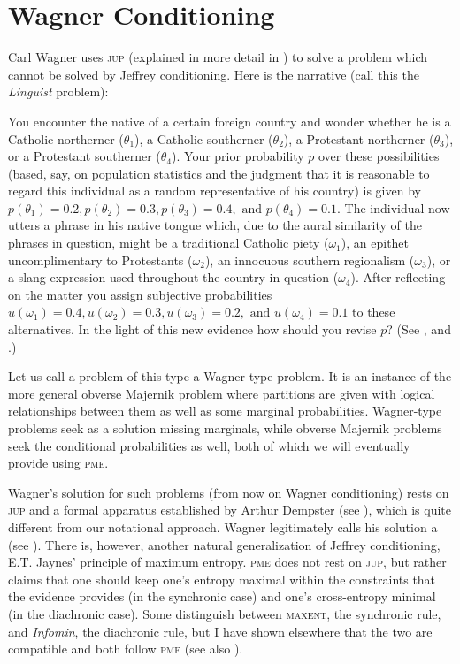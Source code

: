 \documentclass[11pt]{article}
\begin{document}
\section{Wagner Conditioning}
\label{wc}

Carl Wagner uses \textsc{jup} (explained in more detail in
) to solve a problem which cannot be solved by
Jeffrey conditioning. Here is the narrative (call this the
\emph{Linguist} problem):

\begin{quotex}
  You encounter the native of a certain foreign country and wonder
  whether he is a Catholic northerner ($\theta_{1}$), a Catholic
  southerner ($\theta_{2}$), a Protestant northerner ($\theta_{3}$),
  or a Protestant southerner ($\theta_{4}$). Your prior probability
  $p$ over these possibilities (based, say, on population statistics
  and the judgment that it is reasonable to regard this individual as
  a random representative of his country) is given by
  $p(\theta_{1})=0.2,p(\theta_{2})=0.3,p(\theta_{3})=0.4,\mbox{ and
  }p(\theta_{4})=0.1$. The individual now utters a phrase in his
  native tongue which, due to the aural similarity of the phrases in
  question, might be a traditional Catholic piety ($\omega_{1}$), an
  epithet uncomplimentary to Protestants ($\omega_{2}$), an innocuous
  southern regionalism ($\omega_{3}$), or a slang expression used
  throughout the country in question ($\omega_{4}$). After reflecting
  on the matter you assign subjective probabilities
  $u(\omega_{1})=0.4,u(\omega_{2})=0.3,u(\omega_{3})=0.2,\mbox{ and
  }u(\omega_{4})=0.1$ to these alternatives. In the light of this new
  evidence how should you revise $p$? (See ,
  and .)
\end{quotex}

Let us call a problem of this type a Wagner-type problem. It is an
instance of the more general obverse Majernik problem where partitions
are given with logical relationships between them as well as some
marginal probabilities. Wagner-type problems seek as a solution
missing marginals, while obverse Majernik problems seek the
conditional probabilities as well, both of which we will eventually
provide using \textsc{pme}.

Wagner's solution for such problems (from now on Wagner conditioning)
rests on \textsc{jup} and a formal apparatus established by Arthur
Dempster (see ), which is quite different from
our notational approach. Wagner legitimately calls his solution a
 (see
). There is, however, another natural
generalization of Jeffrey conditioning, E.T. Jaynes' principle of
maximum entropy. \textsc{pme} does not rest on \textsc{jup}, but
rather claims that one should keep one's entropy maximal within the
constraints that the evidence provides (in the synchronic case) and
one's cross-entropy minimal (in the diachronic case). Some distinguish
between \textsc{maxent}, the synchronic rule, and \emph{Infomin}, the
diachronic rule, but I have shown elsewhere that the two are
compatible and both follow \textsc{pme} (see also
).
\end{document}
